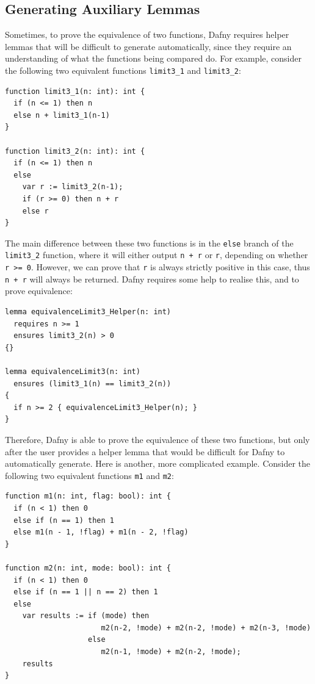 \documentclass[a4paper, 11pt]{article}
\begin{document}
\subsection{Generating Auxiliary Lemmas}

Sometimes, to prove the equivalence of two functions, Dafny requires helper lemmas that will be difficult to generate automatically, since they require an understanding of what the functions being compared do. For example, consider the following two equivalent functions \lstinline|limit3_1| and \lstinline|limit3_2|:
\begin{lstlisting}[caption=\lstinline|limit3_1| and \lstinline|limit3_2| Functions]
function limit3_1(n: int): int {
  if (n <= 1) then n
  else n + limit3_1(n-1)
}

function limit3_2(n: int): int {
  if (n <= 1) then n
  else
    var r := limit3_2(n-1);
    if (r >= 0) then n + r
    else r
}
\end{lstlisting}
%
The main difference between these two functions is in the \lstinline|else| branch of the \lstinline|limit3_2| function, where it will either output \lstinline|n + r| or \lstinline|r|, depending on whether \lstinline|r >= 0|. However, we can prove that \lstinline|r| is always strictly positive in this case, thus \lstinline|n + r| will always be returned. Dafny requires some help to realise this, and to prove equivalence:
\begin{lstlisting}[caption=Auxiliary and Equivalence Lemmas for the \lstinline|limit3_1| and \lstinline|limit3_2| Functions]
lemma equivalenceLimit3_Helper(n: int)
  requires n >= 1
  ensures limit3_2(n) > 0
{}

lemma equivalenceLimit3(n: int)
  ensures (limit3_1(n) == limit3_2(n))
{
  if n >= 2 { equivalenceLimit3_Helper(n); }
}
\end{lstlisting}
%
Therefore, Dafny is able to prove the equivalence of these two functions, but only after the user provides a helper lemma that would be difficult for Dafny to automatically generate. Here is another, more complicated example. Consider the following two equivalent functions \lstinline|m1| and \lstinline|m2|:
\begin{lstlisting}[caption=\lstinline|m1| and \lstinline|m2| Functions]
function m1(n: int, flag: bool): int {
  if (n < 1) then 0
  else if (n == 1) then 1
  else m1(n - 1, !flag) + m1(n - 2, !flag)
}

function m2(n: int, mode: bool): int {
  if (n < 1) then 0
  else if (n == 1 || n == 2) then 1
  else
    var results := if (mode) then
                      m2(n-2, !mode) + m2(n-2, !mode) + m2(n-3, !mode) 
                   else
                      m2(n-1, !mode) + m2(n-2, !mode);
    results
}
\end{lstlisting}
\end{document}

